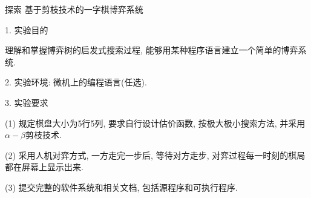 \begin{custom}[explorecolor]{探索}
基于剪枝技术的一字棋博弈系统

    1. 实验目的

    理解和掌握博弈树的启发式搜索过程, 能够用某种程序语言建立一个简单的博弈系统.

    2. 实验环境: 微机上的编程语言(任选).

    3. 实验要求

    (1) 规定棋盘大小为5行5列, 要求自行设计估价函数, 按极大极小搜索方法, 并采用$\alpha-\beta$剪枝技术.

    (2) 采用人机对弈方式, 一方走完一步后, 等待对方走步, 对弈过程每一时刻的棋局都在屏幕上显示出来.

    (3) 提交完整的软件系统和相关文档, 包括源程序和可执行程序.
\end{custom}


